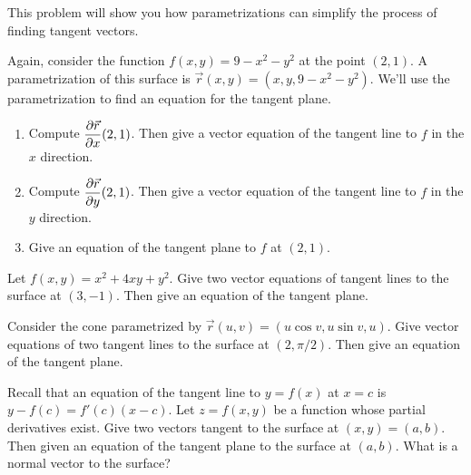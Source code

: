 This problem will show you how parametrizations can simplify the process of finding tangent vectors.
\begin{problem}%
 Again, consider the function $f(x,y)=9-x^2-y^2$ at the point $(2,1)$. A parametrization of this surface is $\vec r(x,y) = (x,y,9-x^2-y^2)$. We'll use the parametrization to find an equation for the tangent plane.
\begin{enumerate}
 \item Compute $\displaystyle\frac{\partial \vec r}{\partial x}(2,1)$. Then give a vector equation of the tangent line to $f$ in the $x$ direction.
 \item Compute $\displaystyle\frac{\partial \vec r}{\partial y}(2,1)$. Then give a vector equation of the tangent line to $f$ in the $y$ direction.
 \item Give an equation of the tangent plane to $f$ at $(2,1)$. 
\end{enumerate}
\end{problem}

\begin{problem}%
 Let $f(x,y)=x^2+4xy+y^2$.  Give two vector equations of tangent lines to the surface at $(3,-1)$. Then give an equation of the tangent plane.
\end{problem}

\begin{problem}%
 Consider the cone parametrized by $\vec r(u,v)=(u\cos v, u\sin v,u)$.  Give vector equations of two tangent lines to the surface at $(2,\pi/2)$. Then give an equation of the tangent plane.
\end{problem}

\begin{problem}\label{general tangent plane with partials}%
 Recall that an equation of the tangent line to $y=f(x)$ at $x=c$ is $y-f(c)=f'(c)(x-c)$. Let $z=f(x,y)$ be a function whose partial derivatives exist. Give two vectors tangent to the surface at $(x,y)=(a,b)$.  Then given an equation of the tangent plane to the surface at $(a,b)$.  What is a normal vector to the surface?
\end{problem}

